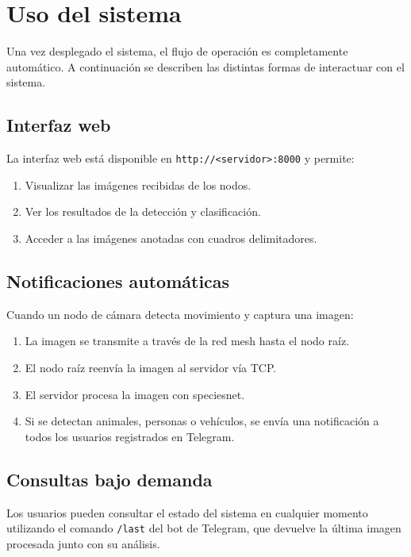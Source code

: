 \documentclass[a4paper, 12pt]{report}
\begin{document}
\section{Uso del sistema}

Una vez desplegado el sistema, el flujo de operación es completamente
automático. A continuación se describen las distintas formas de
interactuar con el sistema.

\subsection{Interfaz web}

La interfaz web está disponible en \texttt{http://<servidor>:8000} y
permite:

\begin{enumerate}
  \item Visualizar las imágenes recibidas de los nodos.
  \item Ver los resultados de la detección y clasificación.
  \item Acceder a las imágenes anotadas con cuadros delimitadores.
\end{enumerate}

\subsection{Notificaciones automáticas}

Cuando un nodo de cámara detecta movimiento y captura una imagen:

\begin{enumerate}
  \item La imagen se transmite a través de la red mesh hasta el
    nodo raíz.
  \item El nodo raíz reenvía la imagen al servidor vía TCP.
  \item El servidor procesa la imagen con \gls{speciesnet}.
  \item Si se detectan animales, personas o vehículos, se envía
    una notificación a todos los usuarios registrados en
    Telegram.
\end{enumerate}

\subsection{Consultas bajo demanda}

Los usuarios pueden consultar el estado del sistema en cualquier
momento utilizando el comando \texttt{/last} del bot de Telegram,
que devuelve la última imagen procesada junto con su análisis.
\end{document}
